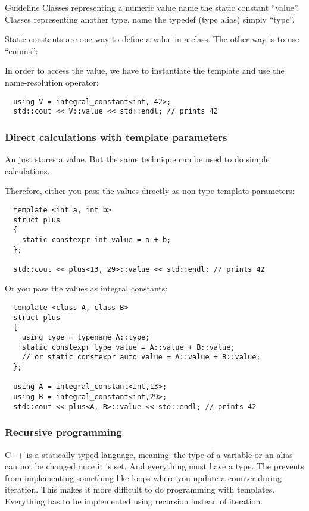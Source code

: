 \begin{guideline}{Guideline}
  Classes representing a numeric value name the static constant ``value''. Classes representing another type, name the typedef (type alias) simply ``type''.
\end{guideline}

\begin{rem}
Static  constants are one way to define a value in a class. The other way is to use ``enums'':
\end{rem}

In order to access the value, we have to instantiate the template and use the name-resolution operator:
\begin{verbatim}
  using V = integral_constant<int, 42>;
  std::cout << V::value << std::endl; // prints 42
\end{verbatim}

\subsubsection{Direct calculations with template parameters}
An  just stores a value. But the same technique can be used to do simple calculations.

Therefore, either you pass the values directly as non-type template parameters:
\begin{verbatim}
  template <int a, int b>
  struct plus
  {
    static constexpr int value = a + b;
  };

  std::cout << plus<13, 29>::value << std::endl; // prints 42
\end{verbatim}

Or you pass the values as integral constants:
\begin{verbatim}
  template <class A, class B>
  struct plus
  {
    using type = typename A::type;
    static constexpr type value = A::value + B::value;
    // or static constexpr auto value = A::value + B::value;
  };

  using A = integral_constant<int,13>;
  using B = integral_constant<int,29>;
  std::cout << plus<A, B>::value << std::endl; // prints 42
\end{verbatim}

\subsubsection{Recursive programming}
C++ is a statically typed language, meaning: the type of a variable or an alias can not be changed once it is set. And everything must
have a type. The prevents from implementing something like loops where you update a counter during iteration. This makes it more
difficult to do programming with templates. Everything has to be implemented using recursion instead of iteration.

